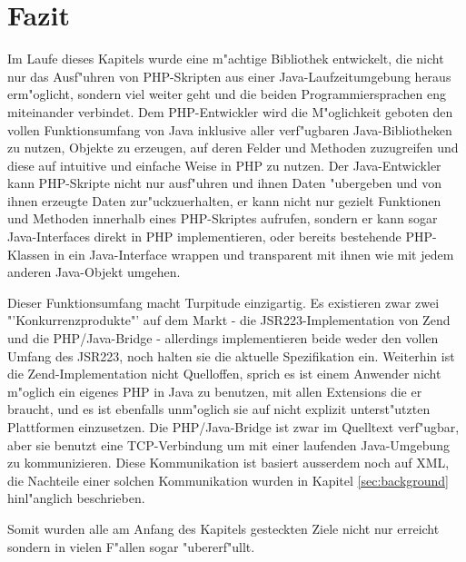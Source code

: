 \section{Fazit}
\label{sec:chap1:fazit}

Im Laufe dieses Kapitels wurde eine m"achtige Bibliothek entwickelt, die nicht nur das Ausf"uhren von
PHP-Skripten aus einer Java-Laufzeitumgebung heraus erm"oglicht, sondern viel weiter geht und die beiden
Programmiersprachen eng miteinander verbindet. Dem PHP-Entwickler wird die M"oglichkeit geboten den
vollen Funktionsumfang von Java inklusive aller verf"ugbaren Java-Bibliotheken zu nutzen, Objekte zu erzeugen,
auf deren Felder und Methoden zuzugreifen und diese auf intuitive und einfache Weise in PHP zu nutzen.
Der Java-Entwickler kann PHP-Skripte nicht nur ausf"uhren und ihnen Daten "ubergeben und von ihnen erzeugte
Daten zur"uckzuerhalten, er kann nicht nur gezielt Funktionen und Methoden innerhalb eines PHP-Skriptes
aufrufen, sondern er kann sogar Java-Interfaces direkt in PHP implementieren, oder bereits bestehende PHP-Klassen
in ein Java-Interface wrappen und transparent mit ihnen wie mit jedem anderen Java-Objekt umgehen.

Dieser Funktionsumfang macht Turpitude einzigartig. Es existieren zwar zwei "'Konkurrenzprodukte"' auf dem
Markt - die JSR223-Implementation von Zend und die PHP/Java-Bridge \cite{BRIDGEHP} - allerdings implementieren
beide weder den vollen Umfang des JSR223, noch halten sie die aktuelle Spezifikation ein. Weiterhin ist die
Zend-Implementation nicht Quelloffen, sprich es ist einem Anwender nicht m"oglich ein eigenes PHP in Java
zu benutzen, mit allen Extensions die er braucht, und es ist ebenfalls unm"oglich sie auf nicht explizit
unterst"utzten Plattformen einzusetzen. Die PHP/Java-Bridge ist zwar im Quelltext verf"ugbar, aber sie
benutzt eine TCP-Verbindung um mit einer laufenden Java-Umgebung zu kommunizieren. Diese Kommunikation
ist basiert ausserdem noch auf XML, die Nachteile einer solchen Kommunikation wurden in Kapitel \ref{sec:background}
hinl"anglich beschrieben.

Somit wurden alle am Anfang des Kapitels gesteckten Ziele nicht nur erreicht sondern in vielen F"allen sogar
"ubererf"ullt.

